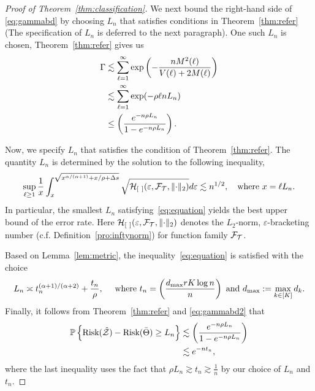 \documentclass[11pt]{article}
\theoremstyle{plain}
\theoremstyle{definition}
\def\risk{\textup{Risk}}
\begin{document}
\begin{proof}[Proof of Theorem~\ref{thm:classification}]
We next bound the right-hand side of \eqref{eq:gammabd} by choosing $L_n$ that satisfies conditions in Theorem~\ref{thm:refer} (The specification of $L_n$ is deferred to the next paragraph). One such $L_n$ is chosen, Theorem~\ref{thm:refer} gives us 
\begin{align}\label{eq:gammabd2}
\Gamma&\lesssim \sum_{\ell=1}^\infty \exp\left(-\frac{nM^2(\ell)}{V(\ell)+2M(\ell)}\right)\\&\lesssim \sum_{\ell=1}^\infty	\exp(-\rho  \ell n L_n)\\&\leq \left(e^{-n\rho L_n}\over 1-e^{-n\rho L_n}\right).
\end{align}

Now, we specify $L_n$ that satisfies the condition of Theorem~\ref{thm:refer}. The quantity $L_n$ is determined by the solution to the following inequality,
\begin{equation}\label{eq:equation}
\sup_{\ell\geq 1}{1\over x}\int_{x}^{\sqrt{x^{\alpha/(\alpha+1)}+x/\rho+\Delta s}}\sqrt{\tH_{[\ ]}(\varepsilon, \tF_{\tT},\vnormSize{}{\cdot})}d\varepsilon \lesssim n^{1/2}, \quad \text{where }x=\ell L_n.
\end{equation}
In particular, the smallest $L_n$ satisfying~\eqref{eq:equation} yields the best upper bound of the error rate. Here $\tH_{[\ ]}(\varepsilon, \tF_{\tT}, \vnormSize{}{\cdot})$ denotes the $L_2$-norm, $\varepsilon$-bracketing number (c.f. Definition~\ref{pro:inftynorm}) for function family $\mathcal{F}_{\mathcal{T}}$.

Based on Lemma~\ref{lem:metric}, the inequality~\eqref{eq:equation} is satisfied with the choice
\begin{equation}\label{eq:delta}
L_n\asymp  t_n^{(\alpha+1)/(\alpha+2)}+{t_n\over \rho}, \quad \text{ where } t_n = \left(d_{\max}rK \log n\over n\right) \text{ and } d_{\max} := \max_{k\in[K]} d_k.
\end{equation}
Finally, it follows from Theorem~\ref{thm:refer} and \eqref{eq:gammabd2} that 
\begin{align}
\mathbb{P}\left\{\risk(\hat \tZ)-\risk(\bar\Theta)\geq L_n\right\}&\lesssim \left(e^{-n\rho L_n}\over 1-e^{-n\rho L_n}\right)\\&\lesssim e^{-nt_n},
\end{align}
where the last inequality uses the fact that $\rho L_n\gtrsim t_n\gtrsim \frac{1}{n}$ by our choice of $L_n$ and $t_n$.



\end{proof}
\end{document}
